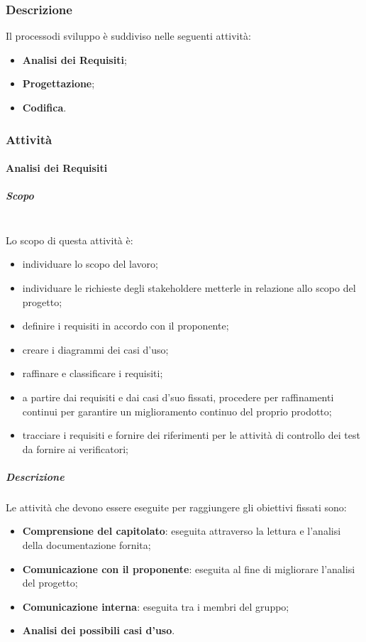 		\subsubsection{Descrizione}
		Il processo\glosp di sviluppo è suddiviso nelle seguenti attività:
		\begin{itemize}
			\item \textbf{Analisi dei Requisiti};
			\item \textbf{Progettazione}\glo;
			\item \textbf{Codifica}.
		\end{itemize}
		\subsubsection{Attività}
		\paragraph{Analisi dei Requisiti}
		\subparagraph*{Scopo}\mbox{}\\ [1mm] 
		Lo scopo di questa attività è:
		\begin{itemize}
			\item individuare lo scopo del lavoro;
			\item individuare le richieste degli stakeholder\glosp e metterle in relazione allo scopo del progetto\glo;
			\item definire i requisiti in accordo con il proponente;
			\item creare i diagrammi dei casi d'uso;
			\item raffinare e classificare i requisiti;
			\item a partire dai requisiti e dai casi d'suo fissati, procedere per raffinamenti continui per garantire un miglioramento continuo del proprio prodotto\glo;
			\item tracciare i requisiti e fornire dei riferimenti per le attività di controllo dei test da fornire ai verificatori;
		\end{itemize}
		\subparagraph*{Descrizione}
		Le attività che devono essere eseguite per raggiungere gli obiettivi fissati sono:
		\begin{itemize}
			\item \textbf{Comprensione del capitolato}\glo: eseguita attraverso la lettura e l'analisi della documentazione fornita;
			\item \textbf{Comunicazione con il proponente}: eseguita al fine di migliorare l'analisi del progetto\glo;
			\item \textbf{Comunicazione interna}: eseguita tra i membri del gruppo;
			\item \textbf{Analisi dei possibili casi d'uso}\glo.
		\end{itemize}
